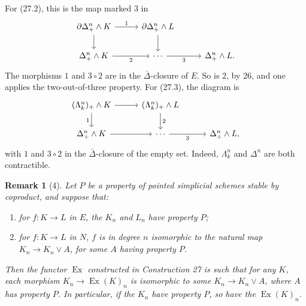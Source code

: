 \documentclass[11pt]{article}
\theoremstyle{deligne}
\newtheorem*{remark*}{Remark}
\newcommand{\Ex}{\operatorname{Ex}}
\begin{document}
For (27.2), this is the map marked \(3\) in
\[
\begin{tikzcd}[column sep=2.8em,row sep=1.7em]
\partial\Delta^n_+\wedge K \arrow[r,"1"] \arrow[d] & \partial\Delta^n_+\wedge L \arrow[d] \\
\Delta^n_+\wedge K \arrow[r,"2"'] & \cdots \arrow[r,"3"'] & \Delta^n_+\wedge L .
\end{tikzcd}
\]
The morphisms \(1\) and \(3\circ2\) are in the \(\bar\Delta\)-closure of \(E\). So is \(2\), by 26, and one applies the two-out-of-three property. For (27.3), the diagram is
\[
\begin{tikzcd}[column sep=2.8em,row sep=1.7em]
(\Lambda^n_k)_+\wedge K \arrow[r] \arrow[d,"1"'] & (\Lambda^n_k)_+\wedge L \arrow[d,"2"] \\
\Delta^n_+\wedge K \arrow[r] & \cdots \arrow[r,"3"'] & \Delta^n_+\wedge L,
\end{tikzcd}
\]
with \(1\) and \(3\circ2\) in the \(\bar\Delta\)-closure of the empty set. Indeed, \(\Lambda^n_k\) and \(\Delta^n\) are both contractible.

\begin{remark*}[4]
Let \(P\) be a property of pointed simplicial schemes stable by coproduct, and suppose that:
\begin{enumerate}[label=(\alph*)]
\item for \(f:K\to L\) in \(E\), the \(K_n\) and \(L_n\) have property \(P\);
\item for \(f:K\to L\) in \(N\), \(f\) is in degree \(n\) isomorphic to the natural map \(K_n\to K_n\vee A\), for some \(A\) having property \(P\).
\end{enumerate}
Then the functor \(\Ex\) constructed in Construction 27 is such that for any \(K\), each morphism \(K_n\to\Ex(K)_n\) is isomorphic to some \(K_n\to K_n\vee A\), where \(A\) has property \(P\). In particular, if the \(K_n\) have property \(P\), so have the \(\Ex(K)_n\).
\end{remark*}
\end{document}
